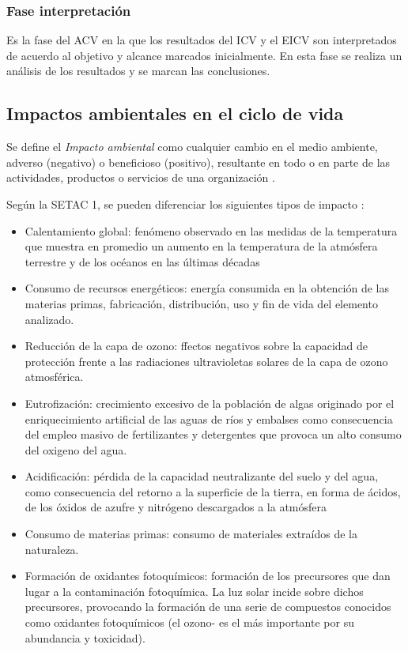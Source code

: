 \subsubsection{Fase interpretación}
Es la fase del ACV en la que los resultados del ICV y el EICV son interpretados de acuerdo al objetivo y alcance marcados inicialmente. En esta fase se realiza un análisis de los resultados y se marcan las conclusiones.

\subsection{Impactos ambientales en el ciclo de vida}\label{sec:impactosamb}

Se define el \textit{Impacto ambiental} como cualquier cambio en el medio ambiente, adverso (negativo) o beneficioso (positivo), resultante en todo o en parte de las actividades, productos o servicios de una organización \cite{mlgceballos}.

Según la SETAC 1, se pueden diferenciar los siguientes tipos de impacto \cite{ihobeeco}:

\begin{itemize}
  \item Calentamiento global: fenómeno observado en las medidas de la temperatura que muestra en promedio un aumento en la temperatura de la atmósfera terrestre y de los océanos en las últimas décadas
  \item Consumo de recursos energéticos: energía consumida en la obtención de las materias primas, fabricación, distribución, uso y fin de vida del elemento analizado.
  \item Reducción de la capa de ozono: ffectos negativos sobre la capacidad de protección frente a las radiaciones ultravioletas solares de la capa de ozono atmosférica.
  \item Eutrofización: crecimiento excesivo de la población de algas originado por el enriquecimiento artificial de las aguas de ríos y embalses como consecuencia del empleo masivo de fertilizantes y detergentes que provoca un alto consumo del oxigeno del agua.
  \item Acidificación: pérdida de la capacidad neutralizante del suelo y del agua, como consecuencia del retorno a la superficie de la tierra, en forma de ácidos, de los óxidos de azufre y nitrógeno descargados a la atmósfera
  \item Consumo de materias primas: consumo de materiales extraídos de la naturaleza.
  \item Formación de oxidantes fotoquímicos: formación de los precursores que dan lugar a la contaminación fotoquímica. La luz solar incide sobre dichos precursores, provocando la formación de una serie de compuestos conocidos como oxidantes fotoquímicos (el ozono- es el más importante por su abundancia y toxicidad).
\end{itemize}

